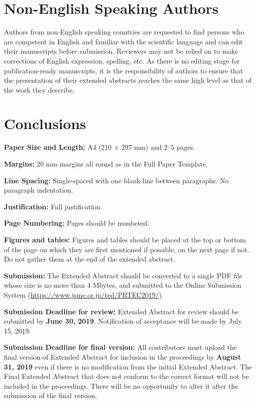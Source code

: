 \documentclass[upint,varvw]{prtec}
\begin{document}



\section{Non-English Speaking Authors}
Authors from non-English speaking countries are requested to find persons who are competent in English and familiar with the scientific language and can edit their manuscripts before submission.  Reviewers may not be relied on to make corrections of English expression, spelling, etc.  As there is no editing stage for publication-ready manuscripts, it is the responsibility of authors to ensure that the presentation of their extended abstracts reaches the same high level as that of the work they describe.

\section{Conclusions}
\textbf{Paper Size and Length:} A4 (210 $\times$ 297 mm) and 2--5 pages.

\textbf{Margins:} 20 mm margins all round as in the Full Paper Template.

\textbf{Line Spacing:} Single-spaced with one blank line between paragraphs. No paragraph indentation.

\textbf{Justification:} Full justification.

\textbf{Page Numbering:} Pages should be numbered.

\textbf{Figures and tables:} Figures and tables should be placed at the top or bottom of the page on which they are first mentioned if possible, on the next page if not. Do not gather them at the end of the extended abstract.

\textbf{Submission:} The Extended Abstract should be converted to a single PDF file whose size is no more than 4 Mbytes, and submitted to the Online Submission System (\url{https://www.jsme.or.jp/ted/PRTEC2019/}).

\textbf{Submission Deadline for review:} Extended Abstract for review should be submitted by \textbf{June 30, 2019}. Notification of acceptance will be made by July 15, 2019.

\textbf{Submission Deadline for final version:} All contributors must upload the final version of Extended Abstract for inclusion in the proceedings by \textbf{August 31, 2019} even if there is no modification from the initial Extended Abstract. The Final Extended Abstract that does not conform to the correct format will not be included in the proceedings.  There will be no opportunity to alter it after the submission of the final version.
\end{document}
